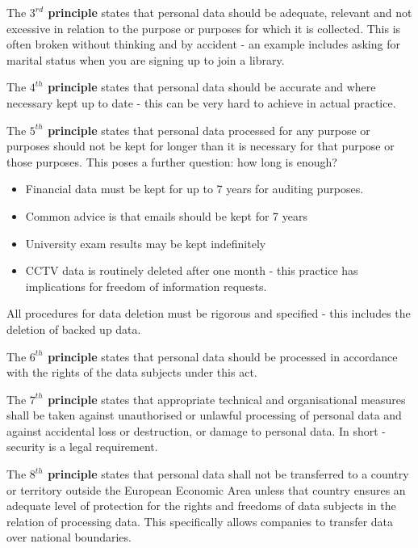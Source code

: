 \documentclass{article}
\begin{document}
	\par 
	The \textbf{$3^{rd}$ principle} states that personal data should be adequate, relevant and not excessive in relation to the purpose or purposes for which it is collected. This is often broken without thinking and by accident - an example includes asking for marital status when you are signing up to join a library.
	
	\par 
	The \textbf{$4^{th}$ principle} states that personal data should be accurate and where necessary kept up to date - this can be very hard to achieve in actual practice.
	
	\par 
	The \textbf{$5^{th}$ principle} states that personal data processed for any purpose or purposes should not be kept for longer than it is necessary for that purpose or those purposes. This poses a further question: how long is enough? 
	\begin{itemize}
		\item Financial data must be kept for up to 7 years for auditing purposes.
		\item Common advice is that emails should be kept for 7 years
		\item University exam results may be kept indefinitely
		\item CCTV data is routinely deleted after one month - this practice has implications for freedom of information requests. 
	\end{itemize}
	
	All procedures for data deletion must be rigorous and specified - this includes the deletion of backed up data.
	
	\par 
	The \textbf{$6^{th}$ principle} states that personal data should be processed in accordance with the rights of the data subjects under this act.
	
	\par 
	The \textbf{$7^{th}$ principle} states that appropriate technical and organisational measures shall be taken against unauthorised or unlawful processing of personal data and against accidental loss or destruction, or damage to personal data. In short - security is a legal requirement.
	
	\par 
	The \textbf{$8^{th}$ principle} states that personal data shall not be transferred to a country or territory outside the European Economic Area unless that country ensures an adequate level of protection for the rights and freedoms of data subjects in the relation of processing data. This specifically allows companies to transfer data over national boundaries.
	
\end{document}
